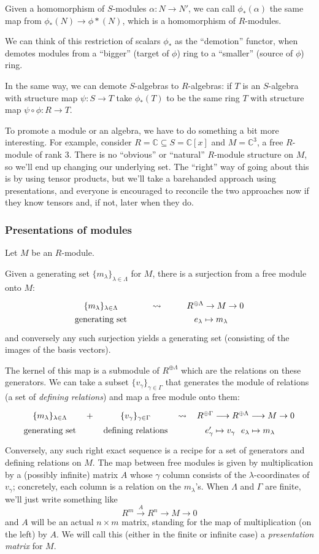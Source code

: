 \documentclass{amsart}[12pt]
\newcommand{\C}{\mathbb{C}}
\numberwithin{equation}{section}
\theoremstyle{plain} %
\theoremstyle{definition}
\theoremstyle{remark}
\newcommand{\sssec}[1]{\subsubsection{#1}}
\begin{document}
Given a homomorphism of $S$-modules $\alpha:N \to N'$, we can call $\phi_*(\alpha)$ the same map from $\phi_*(N)\to \phi*(N)$, which is a homomorphism of $R$-modules.

We can think of this restriction of scalars $\phi_*$ as the ``demotion'' functor, when demotes modules from a ``bigger'' (target of $\phi$) ring to a ``smaller'' (source of $\phi$) ring.

In the same way, we can demote $S$-algebras to $R$-algebras: if $T$ is an $S$-algebra with structure map $\psi:S\to T$ take $\phi_*(T)$ to be the same ring $T$ with structure map $\psi\circ \phi:R\to T$.

To promote a module or an algebra, we have to do something a bit more interesting. For example, consider $R= \C \subseteq S=\C[x]$ and $M=\C^3$, a free $R$-module of rank $3$. There is no ``obvious'' or ``natural'' $R$-module structure on $M$, so we'll end up changing our underlying set. The ``right'' way of going about this is by using tensor products, but we'll take a barehanded approach using presentations, and everyone is encouraged to reconcile the two approaches now if they know tensors and, if not, later when they do.

\sssec{Presentations of modules}

Let $M$ be an $R$-module.

Given a generating set $\{m_\lambda\}_{\lambda\in \Lambda}$ for $M$, there is a surjection from a free module onto $M$:
\[\xymatrix@R=0pc{  \{m_\lambda\}_{\lambda\in \Lambda}  & \rightsquigarrow & R^{\oplus \Lambda} \to M \to 0 \\  \text{generating set} & &  e_\lambda \mapsto m_\lambda \ \ \ }\]
and conversely any such surjection yields a generating set (consisting of the images of the basis vectors).

The kernel of this map is a submodule of $R^{\oplus \Lambda}$ which are the relations on these generators. We can take a subset $\{v_\gamma\}_{\gamma\in \Gamma}$ that generates the module of relations (a set of \emph{defining relations}) and map a free module onto them:
\[\xymatrix@R=0pc@C=.5pc{  \{m_\lambda\}_{\lambda\in \Lambda}  & + & \{v_\gamma\}_{\gamma\in \Gamma} &  \rightsquigarrow & R^{\oplus \Gamma} \longrightarrow R^{\oplus \Lambda} \longrightarrow M \to 0 \\  \text{generating set} & & \text{defining relations} &  & e'_\gamma \mapsto v_\gamma \ \ e_\lambda \mapsto m_\lambda \ \ \ \ }\]
Conversely, any such right exact sequence is a recipe for a set of generators and defining relations on $M$. The map between free modules is given by multiplication by a (possibly infinite) matrix $A$ whose $\gamma$ column consists of the $\lambda$-coordinates of $v_\gamma$; concretely, each column is a relation on the $m_\lambda$'s. When $\Lambda$ and $\Gamma$ are finite, we'll just write something like
\[ R^m \xrightarrow{A} R^n \to M \to 0\]
and $A$ will be an actual $n\times m$ matrix, standing for the map of  multiplication (on the left) by $A$. We will call this (either in the finite or infinite case) a \emph{presentation matrix} for $M$. 
\end{document}
